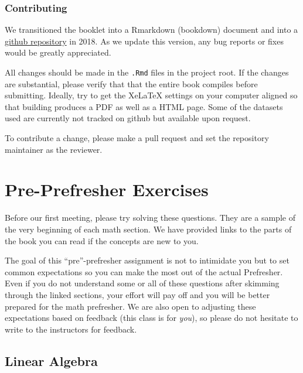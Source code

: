 \documentclass[]{book}
\theoremstyle{definition}
\theoremstyle{definition}
\theoremstyle{definition}
\theoremstyle{remark}
\begin{document}
\hypertarget{contributing}{%
\subsection*{Contributing}\label{contributing}}

We transitioned the booklet into a Rmarkdown (bookdown) document and into a \href{https://github.com/IQSS/prefresher}{github repository} in 2018. As we update this version, any bug reports or fixes would be greatly appreciated.

All changes should be made in the \texttt{.Rmd} files in the project root. If the changes are substantial, please verify that that the entire book compiles before submitting. Ideally, try to get the XeLaTeX settings on your computer aligned so that building produces a PDF as well as a HTML page. Some of the datasets used are currently not tracked on github but available upon request.

To contribute a change, please make a pull request and set the repository maintainer as the reviewer.

\hypertarget{pre-prefresher-exercises}{%
\chapter*{Pre-Prefresher Exercises}\label{pre-prefresher-exercises}}

Before our first meeting, please try solving these questions. They are a sample of the very beginning of each math section. We have provided links to the parts of the book you can read if the concepts are new to you.

The goal of this ``pre''-prefresher assignment is not to intimidate you but to set common expectations so you can make the most out of the actual Prefresher. Even if you do not understand some or all of these questions after skimming through the linked sections, your effort will pay off and you will be better prepared for the math prefresher. We are also open to adjusting these expectations based on feedback (this class is for \emph{you}), so please do not hesitate to write to the instructors for feedback.

\hypertarget{linear-algebra}{%
\section*{Linear Algebra}\label{linear-algebra}}
\end{document}
